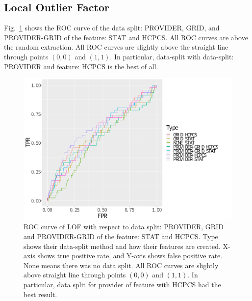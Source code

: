 \documentclass[dvipdfmx, english]{ampmt}             %
\newcommand{\Figref}[1]{Fig.~\ref{#1}}
\begin{document}
\subsection{Local Outlier Factor}

\Figref{fig:roc-lof} shows the ROC curve of the data split: PROVIDER, GRID, and PROVIDER-GRID of the feature: STAT and HCPCS. All ROC curves are above the random extraction. 
All ROC curves are slightly above the straight line through points $(0,0)$ and $(1,1)$. In particular, data-split with data-split: PROVIDER and feature: HCPCS is the best of all.

\begin{figure}[H]
\centerline{\includegraphics[scale=0.5]{../img/lof-roc.pdf}}
\caption{ROC curve of LOF with respect to data split: PROVIDER, GRID and PROVIDER-GRID of the feature: STAT and HCPCS. Type shows their data-split method and how their features are created.
X-axis shows true positive rate, and Y-axis shows false positive rate. None means there was no data split. All ROC curves are slightly above straight line through points $(0,0)$ and $(1,1)$. In particular, data split for provider of feature with HCPCS had the best result.}
\label{fig:roc-lof}
\end{figure}


\end{document}
